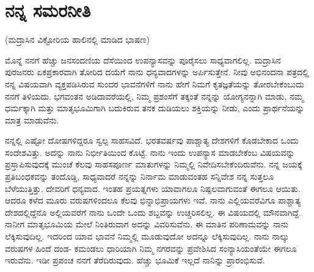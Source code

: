 
\chapter{ನನ್ನ ಸಮರನೀತಿ}

\begin{center}
(ಮದ್ರಾಸಿನ ವಿಕ್ಟೋರಿಯ ಹಾಲಿನಲ್ಲಿ ಮಾಡಿದ ಭಾಷಣ)
\end{center}

ಮೊನ್ನೆ ನನಗೆ ಹೆಚ್ಚು ಜನಸಂದಣಿಯ ದೆಸೆಯಿಂದ ಉಪನ್ಯಾಸವನ್ನು ಪೂರೈಸಲು ಸಾಧ್ಯವಾಗಲಿಲ್ಲ. ಮದ್ರಾಸಿನ ಪುರಜನರು ಏಕಪ್ರಕಾರವಾಗಿ ತೋರಿದ ದಯೆಗೆ ನಾನು ಧನ್ಯವಾದಗಳನ್ನು ಅರ್ಪಿಸುತ್ತೇನೆ. ನೀವು ಅಭಿನಂದನಾ ಪತ್ರದಲ್ಲಿ ನನ್ನ ವಿಷಯವಾಗಿ ವ್ಯಕ್ತಪಡಿಸಿರುವ ಸುಂದರ ಭಾವನೆಗಳಿಗೆ ನಾನು ಹೇಗೆ ನಿಮಗೆ ಕೃತಜ್ಞತೆಯನ್ನು ತೋರಬೇಕೆಂಬುದು ನನಗೆ ತಿಳಿಯದು. ಭಗವಂತನ ಅಡಿದಾವರೆಯಲ್ಲಿ, ನಿಮ್ಮ ಪ್ರಶಂಸೆಗೆ ತಕ್ಕಂತೆ ನನ್ನನ್ನು ಯೋಗ್ಯನನ್ನಾಗಿ ಮಾಡು, ನಮ್ಮ ಧರ್ಮಕ್ಕಾಗಿ ಮತ್ತು ಮಾತೃಭೂಮಿಗಾಗಿ ಬದುಕಿರುವ ತನಕ ದುಡಿಯಲು ಶಕ್ತಿಯನ್ನು ನೀಡು, ಎಂದು ಪ್ರಾರ್ಥನೆಯನ್ನು ಮಾತ್ರ ಮಾಡುವೆನು.

ನನ್ನಲ್ಲಿ ಎಷ್ಟೋ ದೋಷಗಳಿದ್ದರೂ ಸ್ವಲ್ಪ ಸಾಹಸವಿದೆ. ಭರತವರ್ಷವು ಪಾಶ್ಚಾತ್ಯ ದೇಶಗಳಿಗೆ ಕೊಡಬೇಕಾದ ಒಂದು ಸಂದೇಶವಿತ್ತು. ಅದನ್ನು ನಾನು ನಿರ್ಭೀತಿಯಿಂದ ಕೊಟ್ಟೆ. ನಾನು ಇಂದು ಉಪನ್ಯಾಸ ಮಾಡಬೇಕೆಂಬ ವಿಷಯವನ್ನು ಪ್ರಸ್ತಾಪಿಸುವುದಕ್ಕೆ ಮುಂಚೆ ಕೆಲವು ಸಾಹಸಪೂರ್ಣ ಮಾತುಗಳನ್ನು ನಿಮ್ಮಲ್ಲಿ ನಿವೇದಿಸಬೇಕೆಂದಿರುವೆನು. ನನ್ನ ಜಯಕ್ಕೆ ಪ್ರತಿಬಂಧಕವನ್ನು ತಂದೊಡ್ಡಿ, ಸಾಧ್ಯವಾದರೆ ನನ್ನನ್ನು ನಿರ್ನಾಮ ಮಾಡುವಂತಹ ಸನ್ನಿವೇಶ ನನ್ನ ಸುತ್ತಲೂ ಬೆಳೆಯುತ್ತಿತ್ತು. ದೇವರಿಗೆ ಧನ್ಯವಾದ. ಇಂತಹ ಪ್ರಯತ್ನಗಳು ಯಾವಾಗಲೂ ನಿಷ್ಫಲವಾಗುವಂತೆ ಈಗಲೂ ಆಯಿತು. ಆದರೂ ಕಳೆದ ಮೂರು ವರುಷಗಳಿಂದಲೂ ಕೆಲವು ಭಿನ್ನಾಭಿಪ್ರಾಯಗಳು ಇವೆ. ನಾನು ಎಲ್ಲಿಯವರೆವಿಗೂ ಪಾಶ್ಚಾತ್ಯ ದೇಶದಲ್ಲಿದ್ದೆನೊ ಅಲ್ಲಿಯವರೆಗೆ ನಾನು ಒಂದೇ ಒಂದು ಶಬ್ದವನ್ನು ಉಚ್ಚರಿಸಲಿಲ್ಲ. ಈ ವಿಷಯದಲ್ಲಿ ಮೌನವಾಗಿದ್ದೆ. ನಾನೀಗ ಮಾತೃಭೂಮಿಯ ಮೇಲೆ ನಿಂತಿರುವಾಗ ಅದನ್ನು ವಿವರಿಸುವೆನು. ಈ ಮಾತಿನ ಪರಿಣಾಮವನ್ನು ನಾನು ಲೆಕ್ಕಿಸುವುದಿಲ್ಲ. ಇದರಿಂದ ಯಾವ ಭಾವನೆ ನಿಮ್ಮಲ್ಲಿ ಮೂಡುವುದೋ ಅದನ್ನೂ ಲೆಕ್ಕಿಸುವುದಿಲ್ಲ. ನಾನು ನಾಲ್ಕು ವರುಷಗಳ ಹಿಂದೆ ದಂಡ- ಕಮಂಡಲು ಧಾರಿಯಾಗಿ ನಿಮ್ಮ ನಗರವನ್ನು ಪ್ರವೇಶಿಸಿದ ಸಂನ್ಯಾಸಿಯಂತೆಯೇ ಈಗಲೂ ಇರುವೆನು. ಇಡೀ ಪ್ರಪಂಚ ನನಗೆ ತೆರೆದಿರುವುದು. ಹೆಚ್ಚು ಭೂಮಿಕೆ ಇಲ್ಲದೆ ನಾನಿನ್ನು ಪ್ರಾರಂಭಿಸುವೆ.

